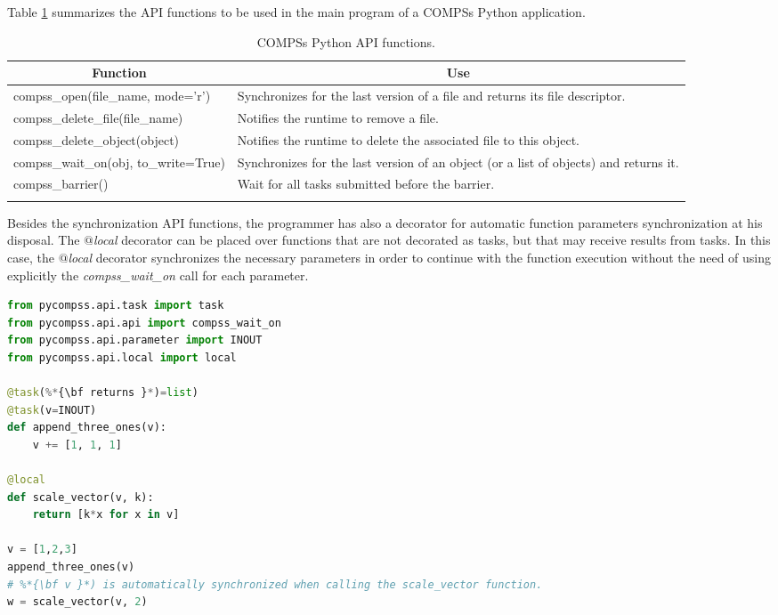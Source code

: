 Table \ref{tab:python_api_functions} summarizes the API functions to be used in the main program of a COMPSs Python application.
\bgroup
  \def\arraystretch{1.5}%
  \begin{longtable}{| p{} | p{} |}
    \hline
    \multicolumn{1}{|c|}{{\bf Function }}    &  \multicolumn{1}{c|}{{\bf Use }}\\
    \hline
    compss\_open(file\_name, mode='r') & Synchronizes for the last version of a file and returns its file descriptor. \\
    \hline
    compss\_delete\_file(file\_name) & Notifies the runtime to remove a file. \\
    \hline
    compss\_delete\_object(object) & Notifies the runtime to delete the associated file to this object. \\
    \hline
    compss\_wait\_on(obj, to\_write=True) & Synchronizes for the last version of an object (or a list of objects) and returns it. \\
    \hline
    compss\_barrier() & Wait for all tasks submitted before the barrier. \\
    \hline
    \caption{COMPSs Python API functions.}
    \label{tab:python_api_functions}
  \end{longtable}
\egroup

Besides the synchronization API functions, the programmer has also a decorator for automatic function parameters synchronization 
at his disposal. The {\it $@$local} decorator can be placed over functions that are not decorated as tasks, but that may receive 
results from tasks. In this case, the {\it $@$local} decorator synchronizes the necessary parameters in order to continue with 
the function execution without the need of using explicitly the {\it compss\_wait\_on} call for each parameter.

\begin{lstlisting}[language=python]
from pycompss.api.task import task
from pycompss.api.api import compss_wait_on
from pycompss.api.parameter import INOUT
from pycompss.api.local import local

@task(%*{\bf returns }*)=list)
@task(v=INOUT)
def append_three_ones(v):
    v += [1, 1, 1]

@local
def scale_vector(v, k):
    return [k*x for x in v]

v = [1,2,3]
append_three_ones(v)
# %*{\bf v }*) is automatically synchronized when calling the scale_vector function.
w = scale_vector(v, 2)

\end{lstlisting}


